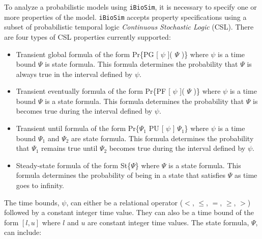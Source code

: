 \documentclass[titlepage,11pt]{article}
\begin{document}
\noindent
To analyze a probabilistic models using {\tt iBioSim}, it is necessary to specify one or more properties of
the model.  {\tt iBioSim} accepts property specifications using a subset of probabilistic temporal logic \emph{Continuous Stochastic Logic} (CSL).  There are four types of CSL properties currently supported:
\begin{itemize}
\item Transient global formula of the form Pr\{PG [ $\psi$ ]( $\Psi$ )\} where $\psi$ is a time bound $\Psi$ is state formula.  This formula determines the probability that $\Psi$ is always true in the interval defined by $\psi$.
\item Transient eventually formula of the form Pr\{PF [ $\psi$ ]( $\Psi$ )\} where $\psi$ is a time bound $\Psi$ is a state formula.  This formula determines the probability that $\Psi$ is becomes true during the interval defined by $\psi$.
\item Transient until formula of the form Pr\{$\Psi_1$ PU [ $\psi$ ] $\Psi_1$\} where $\psi$ is a time bound $\Psi_1$ and $\Psi_2$ are state formula.  This formula determines the probability that $\Psi_1$ remains true until $\Psi_2$ becomes true during the interval defined by $\psi$.
\item Steady-state formula of the form St\{$\Psi$\} where $\Psi$ is a state formula.  This formula determines the probability of being in a state that satisfies $\Psi$ as time goes to infinity.
\end{itemize}
The time bounds, $\psi$, can either be a relational operator ($<$, $\leq$, $=$, $\geq$, $>$) followed by a constant integer time value.  They can also be a time bound of the form $[ l, u ]$ where $l$ and $u$ are constant integer time values.  The state formula, $\Psi$, can include:
\end{document}

